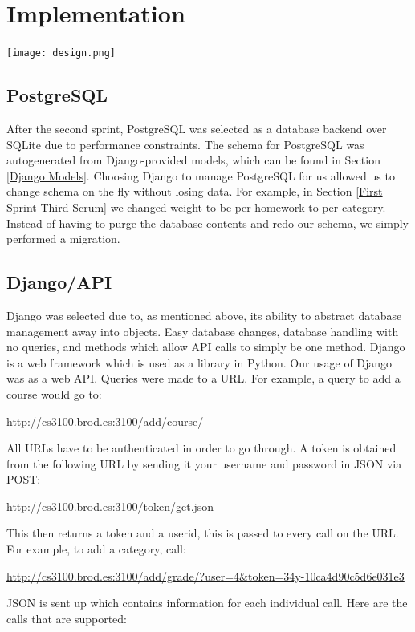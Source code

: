 \documentclass[a4paper]{article} %
\begin{document}
\section{Implementation}

\centerline{\texttt{[image: design.png]}}

\subsection{PostgreSQL}

After the second sprint, PostgreSQL was selected as a database backend over SQLite due to performance constraints. The schema for PostgreSQL was autogenerated from Django-provided models, which can be found in Section \ref{Django Models}. Choosing Django to manage PostgreSQL for us allowed us to change schema on the fly without losing data. For example, in Section \ref{First Sprint Third Scrum} we changed weight to be per homework to per category. Instead of having to purge the database contents and redo our schema, we simply performed a migration.

\subsection{Django/API}

Django was selected due to, as mentioned above, its ability to abstract database management away into objects. Easy database changes, database handling with no queries, and methods which allow API calls to simply be one method.  Django is a web framework which is used as a library in Python. Our usage of Django was as a web API.
Queries were made to a URL. For example, a query to add a course would go to:

\indent\url{http://cs3100.brod.es:3100/add/course/}

All URLs have to be authenticated in order to go through. A token is obtained from the following URL by sending it your username and password in JSON via POST:

\indent\url{http://cs3100.brod.es:3100/token/get.json}

This then returns a token and a userid, this is passed to every call on the URL. For example, to add a category, call:

\indent\url{http://cs3100.brod.es:3100/add/grade/?user=4&token=34y-10ca4d90c5d6e031e3}

JSON is sent up which contains information for each individual call. Here are the calls that are supported:
\end{document}
